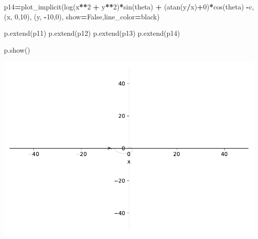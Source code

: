 \documentclass[
]{book}
\newenvironment{Shaded}{\begin{snugshade}}{\end{snugshade}}
\newcommand{\DecValTok}[1]{\textcolor[rgb]{0.00,0.00,0.81}{#1}}
\newcommand{\NormalTok}[1]{#1}
\newcommand{\OperatorTok}[1]{\textcolor[rgb]{0.81,0.36,0.00}{\textbf{#1}}}
\newcommand{\StringTok}[1]{\textcolor[rgb]{0.31,0.60,0.02}{#1}}
\newcommand{\VariableTok}[1]{\textcolor[rgb]{0.00,0.00,0.00}{#1}}
\theoremstyle{definition}
\theoremstyle{definition}
\theoremstyle{definition}
\theoremstyle{definition}
\theoremstyle{remark}
\begin{document}
\begin{Shaded}
\begin{Highlighting}[]
\NormalTok{p14}\OperatorTok{=}\NormalTok{plot\_implicit(log(x}\OperatorTok{**}\DecValTok{2} \OperatorTok{+}\NormalTok{ y}\OperatorTok{**}\DecValTok{2}\NormalTok{)}\OperatorTok{*}\NormalTok{sin(theta) }\OperatorTok{+}\NormalTok{ (atan(y}\OperatorTok{/}\NormalTok{x)}\OperatorTok{+}\DecValTok{0}\NormalTok{)}\OperatorTok{*}\NormalTok{cos(theta) }\OperatorTok{{-}}\NormalTok{c,}
\NormalTok{(x, }\DecValTok{0}\NormalTok{,}\DecValTok{10}\NormalTok{), (y, }\OperatorTok{{-}}\DecValTok{10}\NormalTok{,}\DecValTok{0}\NormalTok{), show}\OperatorTok{=}\VariableTok{False}\NormalTok{,line\_color}\OperatorTok{=}\StringTok{\textquotesingle{}black\textquotesingle{}}\NormalTok{)}

\NormalTok{p.extend(p11)}
\NormalTok{p.extend(p12)}
\NormalTok{p.extend(p13)}
\NormalTok{p.extend(p14)}

\NormalTok{p.show()}
\end{Highlighting}
\end{Shaded}

\includegraphics{ConformalMapping_files/figure-latex/unnamed-chunk-63-13.pdf}
\end{document}
